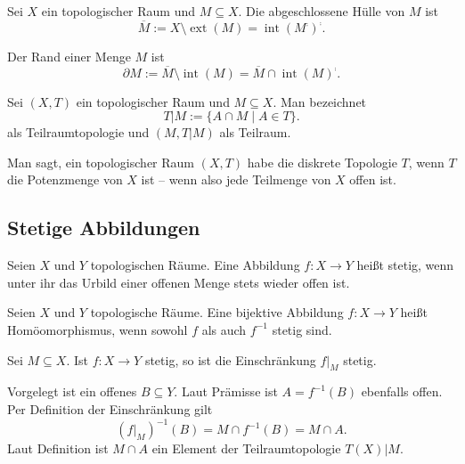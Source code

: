 \begin{Definition}\newlinefirst
Sei $X$ ein topologischer Raum und $M\subseteq X$. Die abgeschlossene Hülle von $M$ ist%
\[\overline M := X\setminus\operatorname{ext}(M) = \operatorname{int}(M^\comp)^\comp.\]
\end{Definition}

\begin{Definition}[Rand]
Der Rand einer Menge $M$ ist
\[\partial M := \overline M\setminus\operatorname{int}(M)
= \overline M\cap\operatorname{int}(M)^\comp.\]
\end{Definition}

\begin{Definition}[Teilraumtopologie]\newlinefirst
Sei $(X,T)$ ein topologischer Raum und $M\subseteq X$. Man bezeichnet
\[T|M := \{A\cap M\mid A\in T\}.\]
als Teilraumtopologie und $(M,T|M)$ als Teilraum.
\end{Definition}

\begin{Definition}\newlinefirst
Man sagt, ein topologischer Raum $(X,T)$ habe die diskrete Topologie $T$,
wenn $T$ die Potenzmenge von $X$ ist -- wenn also jede Teilmenge
von $X$ offen ist.
\end{Definition}

\subsection{Stetige Abbildungen}

\begin{Definition}\label{def:cont}\newlinefirst
Seien $X$ und $Y$ topologischen Räume. Eine Abbildung $f\colon X\to Y$
heißt stetig, wenn unter ihr das Urbild einer offenen Menge stets
wieder offen ist.
\end{Definition}

\begin{Definition}[Homöomorphismus]\newlinefirst
Seien $X$ und $Y$ topologische Räume. Eine bijektive Abbildung
$f\colon X\to Y$ heißt Homöomorphismus, wenn sowohl $f$ als auch
$f^{-1}$ stetig sind.
\end{Definition}

\begin{Satz}
Sei $M\subseteq X$. Ist $f\colon X\to Y$ stetig, so ist
die Einschränkung $f|_M$ stetig.
\end{Satz}
\begin{Beweis}
Vorgelegt ist ein offenes $B\subseteq Y$. Laut Prämisse ist $A=f^{-1}(B)$
ebenfalls offen. Per Definition der Einschränkung gilt
\[(f|_M)^{-1}(B) = M\cap f^{-1}(B) = M\cap A.\]
Laut Definition ist $M\cap A$ ein Element der Teilraumtopologie $T(X)|M$.\,\qedsymbol
\end{Beweis}

